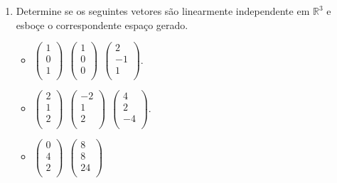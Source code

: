\documentclass{article}
\theoremstyle{plain}
\theoremstyle{obs}
\numberwithin{equation}{section}
\begin{document}
\begin{enumerate}
     \item Determine se os seguintes vetores são linearmente independente
     em $\mathbb{R}^{3}$ e esboçe o correspondente espaço gerado.
        \begin{itemize}
        \item  
       $ 
       \begin{pmatrix}
       1  \\
       0  \\
       1  \\
       \end{pmatrix}
       \  \
       \begin{pmatrix}
       1  \\
       0  \\
       0  \\
       \end{pmatrix}
       \ \ 
       \begin{pmatrix}
       2 \\
       -1 \\
       1 \\
       \end{pmatrix}
       $. 
        \item  
       $ 
       \begin{pmatrix}
       2  \\
       1  \\
       2  \\
       \end{pmatrix}
       \  \
       \begin{pmatrix}
       -2  \\
       1 \\
       2  \\
       \end{pmatrix}
       \ \ 
       \begin{pmatrix}
       4 \\
       2 \\
       -4 \\
       \end{pmatrix}
       $.
          \item  
       $ 
       \begin{pmatrix}
       0  \\
       4  \\
       2  \\
       \end{pmatrix}
       \  \
       \begin{pmatrix}
       8  \\
       8 \\
       24  \\
       \end{pmatrix}
       $
        \end{itemize}
       

\end{enumerate}
\end{document}
